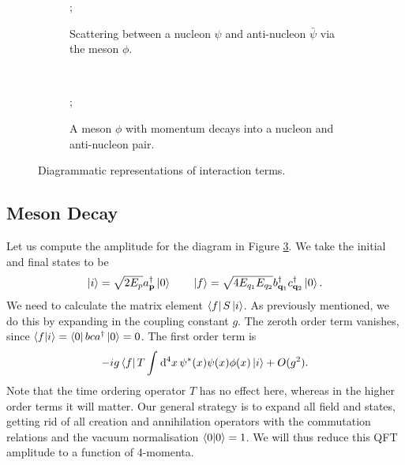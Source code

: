 \begin{example}[]
  \begin{figure}[t]
    \begin{subfigure}[t]{0.5\textwidth}
      \centering
      ;
      \caption{Scattering between a nucleon $\psi$ and anti-nucleon $\bar\psi$ via the meson $\phi$.}
      \label{fig:nucleon-scattering}
    \end{subfigure}
    ~
    \begin{subfigure}[t]{0.5\textwidth}
      \centering
      ;
      \caption{A meson $\phi$ with momentum decays into a nucleon and anti-nucleon pair.}
      \label{fig:meson-decay}
    \end{subfigure}
    \caption{Diagrammatic representations of interaction terms.}
  \end{figure}

\end{example} 

\subsection{Meson Decay}%
\label{sub:meson_decay}

Let us compute the amplitude for the diagram in Figure \ref{fig:meson-decay}.
We take the initial and final states to be
\begin{equation}
  \ket{i} = \sqrt{2 E_p} a_{\vb{p}}^{\dagger} \ket{0} \qquad \ket{f} = \sqrt{4 E_{q_1} E_{q_2}} b_{\vb{q}_1}^{\dagger} c_{\vb{q}_2} ^{\dagger} \ket{0}.
\end{equation}
We need to calculate the matrix element $\bra{ f} S \ket{i}$.
As previously mentioned, we do this by expanding in the coupling constant $g$.
The zeroth order term vanishes, since ${\bra{f}\ket{i} = \bra{0} b c a^{\dagger} \ket{0} = 0}$.
The first order term is
\begin{equation}
  -ig \bra{f}T \int_{}^{} \dd[4]{x} \psi^*(x) \psi(x) \phi(x) \ket{i} + O(g^2).
\end{equation}
Note that the time ordering operator $T$ has no effect here, whereas in the higher order terms it will matter.
Our general strategy is to expand all field and states, getting rid of all creation and annihilation operators with the commutation relations and the vacuum normalisation $\bra{0} \ket{0} = 1$.
We will thus reduce this QFT amplitude to a function of 4-momenta.

